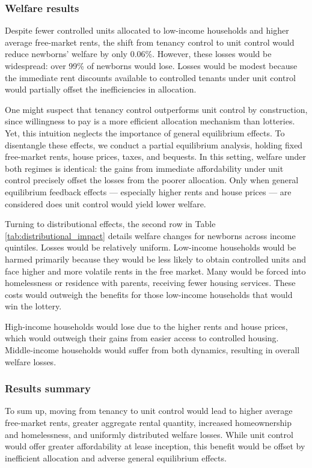 \documentclass[parskip=full]{article}
\begin{document}
\subsubsection{Welfare results}

Despite fewer controlled units allocated to low-income households and higher average free-market rents, the shift from tenancy control to unit control would reduce newborns' welfare by only 0.06\%. However, these losses would be widespread: over 99\% of newborns would lose. Losses would be modest because the immediate rent discounts available to controlled tenants under unit control would partially offset the inefficiencies in allocation.

One might suspect that tenancy control outperforms unit control by construction, since willingness to pay is a more efficient allocation mechanism than lotteries. Yet, this intuition neglects the importance of general equilibrium effects. To disentangle these effects, we conduct a partial equilibrium analysis, holding fixed free-market rents, house prices, taxes, and bequests. In this setting, welfare under both regimes is identical: the gains from immediate affordability under unit control precisely offset the losses from the poorer allocation. Only when general equilibrium feedback effects — especially higher rents and house prices — are considered does unit control would yield lower welfare. 

Turning to distributional effects, the second row in Table \ref{tab:distributional_impact} details welfare changes for newborns across income quintiles. Losses would be relatively uniform. Low-income households would be harmed primarily because they would be less likely to obtain controlled units and face higher and more volatile rents in the free market. Many would be forced into homelessness or residence with parents, receiving fewer housing services. These costs would outweigh the benefits for those low-income households that would win the lottery.

High-income households would lose due to the higher rents and house prices, which would outweigh their gains from easier access to controlled housing. Middle-income households would suffer from both dynamics, resulting in overall welfare losses.

\subsubsection{Results summary}

To sum up, moving from tenancy to unit control would lead to higher average free-market rents, greater aggregate rental quantity, increased homeownership and homelessness, and uniformly distributed welfare losses. While unit control would offer greater affordability at lease inception, this benefit would be offset by inefficient allocation and adverse general equilibrium effects.
\end{document}
